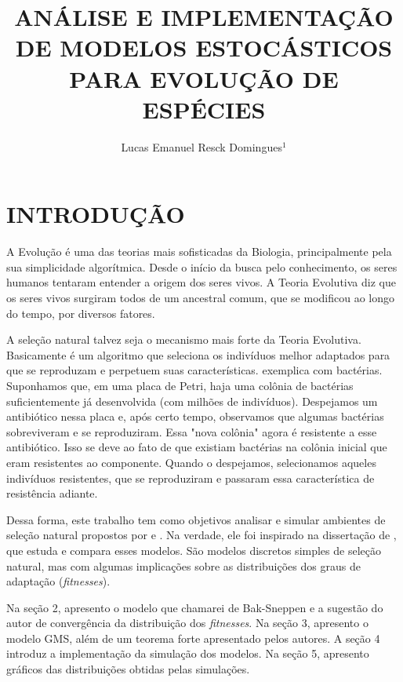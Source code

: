 \documentclass[10pt,brazil,english]{article}
\title{ANÁLISE E IMPLEMENTAÇÃO DE MODELOS ESTOCÁSTICOS PARA EVOLUÇÃO DE ESPÉCIES}
\author{Lucas Emanuel Resck Domingues$^{1}$}
\begin{document}
    \pagestyle{fancy} %
    
    \maketitle
    \newpage

    \newtheorem{theorem}{Teorema}
    
    \section{INTRODUÇÃO}

        A Evolução é uma das teorias mais sofisticadas da Biologia, principalmente pela sua simplicidade algorítmica.
        Desde o início da busca pelo conhecimento, os seres humanos tentaram entender a origem dos seres vivos.
        A Teoria Evolutiva diz que os seres vivos surgiram todos de um ancestral comum, que se modificou ao longo do tempo, por diversos fatores.
        
        A seleção natural talvez seja o mecanismo mais forte da Teoria Evolutiva.
        Basicamente é um algoritmo que seleciona os indivíduos melhor adaptados para que se reproduzam e perpetuem suas características.
         exemplica com bactérias. Suponhamos que, em uma placa de Petri, haja uma colônia de bactérias suficientemente já desenvolvida (com milhões de indivíduos).
        Despejamos um antibiótico nessa placa e, após certo tempo, observamos que algumas bactérias sobreviveram e se reproduziram.
        Essa "nova colônia" \space agora é resistente a esse antibiótico.
        Isso se deve ao fato de que existiam bactérias na colônia inicial que eram resistentes ao componente.
        Quando o despejamos, selecionamos aqueles indivíduos resistentes, que se reproduziram e passaram essa característica de resistência adiante.

        Dessa forma, este trabalho tem como objetivos analisar e simular ambientes de seleção natural propostos por  e .
        Na verdade, ele foi inspirado na dissertação de , que estuda e compara esses modelos.
        São modelos discretos simples de seleção natural, mas com algumas implicações sobre as distribuições dos graus de adaptação (\textit{fitnesses}).

        Na seção 2, apresento o modelo que chamarei de Bak-Sneppen e a sugestão do autor de convergência da distribuição dos \textit{fitnesses}.
        Na seção 3, apresento o modelo GMS, além de um teorema forte apresentado pelos autores.
        A seção 4 introduz a implementação da simulação dos modelos.
        Na seção 5, apresento gráficos das distribuições obtidas pelas simulações.
        
\end{document}
